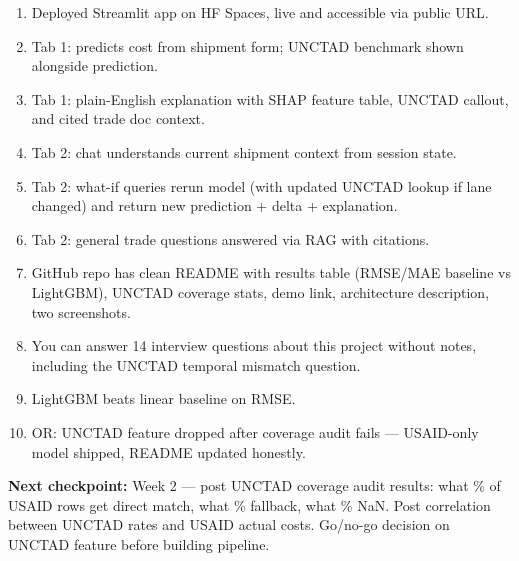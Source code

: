 \documentclass[11pt, a4paper]{article}
\begin{document}
\begin{enumerate}
  \item Deployed Streamlit app on HF Spaces, live and accessible via public URL.
  \item Tab 1: predicts cost from shipment form; UNCTAD benchmark shown alongside prediction.
  \item Tab 1: plain-English explanation with SHAP feature table, UNCTAD callout, and cited trade doc context.
  \item Tab 2: chat understands current shipment context from session state.
  \item Tab 2: what-if queries rerun model (with updated UNCTAD lookup if lane changed) and return new prediction + delta + explanation.
  \item Tab 2: general trade questions answered via RAG with citations.
  \item GitHub repo has clean README with results table (RMSE/MAE baseline vs LightGBM), UNCTAD coverage stats, demo link, architecture description, two screenshots.
  \item You can answer 14 interview questions about this project without notes, including the UNCTAD temporal mismatch question.
  \item LightGBM beats linear baseline on RMSE.
  \item OR: UNCTAD feature dropped after coverage audit fails --- USAID-only model shipped, README updated honestly.
\end{enumerate}

\begin{infobox}
\textbf{Next checkpoint:} Week 2 --- post UNCTAD coverage audit results: what \% of USAID rows get direct match, what \% fallback, what \% NaN. Post correlation between UNCTAD rates and USAID actual costs. Go/no-go decision on UNCTAD feature before building pipeline.
\end{infobox}
\end{document}
